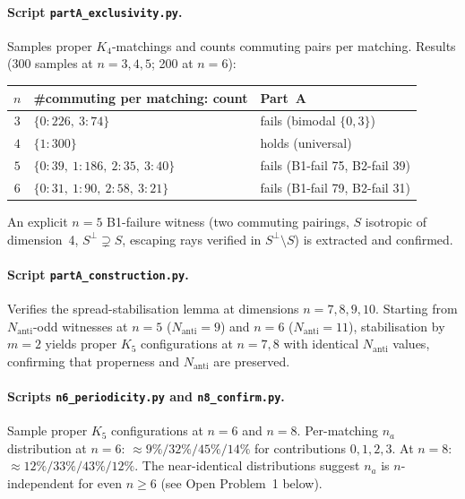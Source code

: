 \documentclass[11pt,a4paper]{article}
\newcommand{\Nanti}{N_{\mathrm{anti}}}
\theoremstyle{plain}
\theoremstyle{definition}
\theoremstyle{remark}
\begin{document}
\paragraph{Script \texttt{partA\_exclusivity.py}.}
Samples proper $K_4$-matchings and counts commuting pairs per matching.
Results (300 samples at $n = 3,4,5$; 200 at $n = 6$):
\begin{center}
\renewcommand{\arraystretch}{1.1}
\begin{tabular}{cll}
\toprule
$n$ & \#commuting per matching: count & Part~A \\
\midrule
$3$ & $\{0{:}226,\ 3{:}74\}$ &
      fails (bimodal $\{0,3\}$) \\
$4$ & $\{1{:}300\}$ &
      holds (universal) \\
$5$ & $\{0{:}39,\ 1{:}186,\ 2{:}35,\ 3{:}40\}$ &
      fails (B1-fail 75, B2-fail 39) \\
$6$ & $\{0{:}31,\ 1{:}90,\ 2{:}58,\ 3{:}21\}$ &
      fails (B1-fail 79, B2-fail 31) \\
\bottomrule
\end{tabular}
\end{center}
An explicit $n = 5$ B1-failure witness (two commuting pairings,
$S$ isotropic of dimension~4, $S^\perp \supsetneq S$,
escaping rays verified in $S^\perp \setminus S$) is extracted and
confirmed.

\paragraph{Script \texttt{partA\_construction.py}.}
Verifies the spread-stabilisation lemma at dimensions $n = 7,8,9,10$.
Starting from $\Nanti$-odd witnesses at $n = 5$ ($\Nanti = 9$) and
$n = 6$ ($\Nanti = 11$), stabilisation by $m = 2$ yields proper $K_5$
configurations at $n = 7, 8$ with identical $\Nanti$ values,
confirming that properness and $\Nanti$ are preserved.

\paragraph{Scripts \texttt{n6\_periodicity.py} and \texttt{n8\_confirm.py}.}
Sample proper $K_5$ configurations at $n = 6$ and $n = 8$.
Per-matching $n_a$ distribution at $n = 6$:
$\approx 9\%/32\%/45\%/14\%$ for contributions $0,1,2,3$.
At $n = 8$: $\approx 12\%/33\%/43\%/12\%$.
The near-identical distributions suggest $n_a$ is $n$-independent
for even $n \geq 6$ (see Open Problem~1 below).
\end{document}
